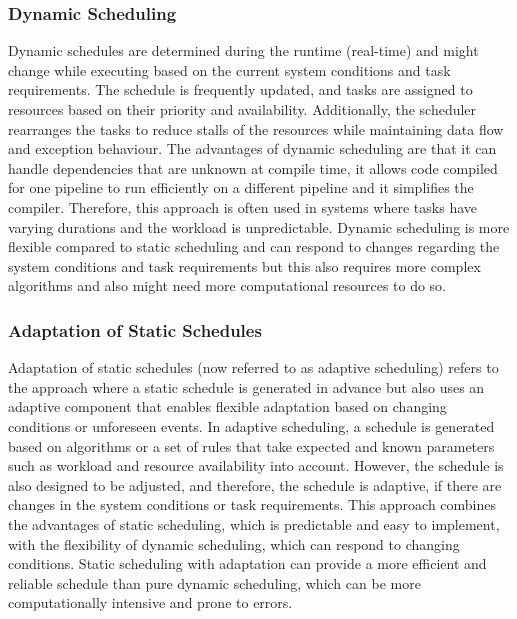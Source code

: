 


            \subsubsection{Dynamic Scheduling}
            \label{sec:dynamic-scheduling-background}

                Dynamic schedules are determined during the runtime (real-time) and might change while executing based on the current system conditions and task requirements.
                The schedule is frequently updated, and tasks are assigned to resources based on their priority and availability.
                Additionally, the scheduler rearranges the tasks to reduce stalls of the resources while maintaining data flow and exception behaviour.
                The advantages of dynamic scheduling are that it can handle dependencies that are unknown at compile time, it allows code compiled for one pipeline to run efficiently on a different pipeline and it simplifies the compiler.
                Therefore, this approach is often used in systems where tasks have varying durations and the workload is unpredictable.
                Dynamic scheduling is more flexible compared to static scheduling and can respond to changes regarding the system conditions and task requirements but this also requires more complex algorithms and also might need more computational resources to do so.


        

            \subsubsection{Adaptation of Static Schedules}
            \label{sec:adaptation-background}

                Adaptation of static schedules (now referred to as adaptive scheduling) refers to the approach where a static schedule is generated in advance but also uses an adaptive component that enables flexible adaptation based on changing conditions or unforeseen events.
                In adaptive scheduling, a schedule is generated based on algorithms or a set of rules that take expected and known parameters such as workload and resource availability into account. However, the schedule is also designed to be adjusted, and therefore, the schedule is adaptive, if there are changes in the system conditions or task requirements.
                This approach combines the advantages of static scheduling, which is predictable and easy to implement, with the flexibility of dynamic scheduling, which can respond to changing conditions. Static scheduling with adaptation can provide a more efficient and reliable schedule than pure dynamic scheduling, which can be more computationally intensive and prone to errors.

